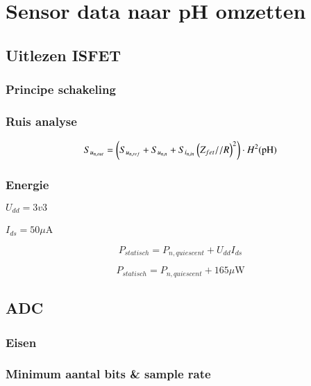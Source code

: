 \section{Sensor data naar pH omzetten}

\subsection*{Uitlezen ISFET}

    \begin{frame}
        \frametitle{Principe schakeling}
    
        
    
    \end{frame}
    \begin{frame}
        \frametitle{Ruis analyse}
    
        \begin{figure}
            \centering
            \def\svgwidth{0.6\textwidth}
            
        \end{figure}
        \begin{equation}\label{eq:measureNoiseOut}
            S_{u_{{n,out}}} = \left(S_{u_{{n,ref}}} + S_{u_{{n,n}}} + S_{i_{{n,in}}}\left(Z_{fet} // R\right)^2\right) \cdot H^2(\mathrm{pH})
        \end{equation}
    
    \end{frame}
    \begin{frame}
        \frametitle{Energie}

        $U_{dd}=3v3$

        \noindent
        $I_{ds}=50\mu$A
    
        \begin{equation}\label{eq:measurePower}
            P_{statisch} = P_{n,quiescent} + U_{dd}I_{ds}
        \end{equation}

        \pause

        \begin{equation}
            P_{statisch} = P_{n,quiescent} + 165\mu\mathrm{W}
        \end{equation}
    
    \end{frame}

    \subsection*{ADC}
    \begin{frame}
        \frametitle{Eisen}
    
        
    
    \end{frame}
    \begin{frame}
        \frametitle{Minimum aantal bits \& sample rate}
    
        
    
    \end{frame}

